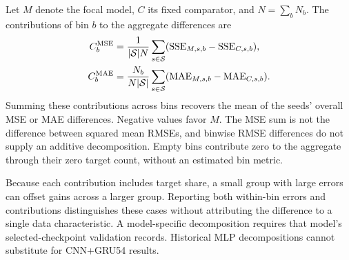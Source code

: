 \documentclass[runningheads]{llncs}
\begin{document}
Let $M$ denote the focal model, $C$ its fixed comparator, and
$N=\sum_bN_b$. The contributions of bin $b$ to the aggregate differences are
\begin{align}
 C_b^{\rm MSE}&=\frac{1}{|\mathcal S|N}\sum_{s\in\mathcal S}
  (\mathrm{SSE}_{M,s,b}-\mathrm{SSE}_{C,s,b}),
  \label{eq:strata-mse-contribution}\\
 C_b^{\rm MAE}&=\frac{N_b}{N|\mathcal S|}\sum_{s\in\mathcal S}
  (\mathrm{MAE}_{M,s,b}-\mathrm{MAE}_{C,s,b}).
  \label{eq:strata-mae-contribution}
\end{align}
Summing these contributions across bins recovers the mean of the seeds'
overall MSE or MAE differences. Negative values favor $M$. The MSE sum is
not the difference between squared mean RMSEs, and binwise RMSE differences
do not supply an additive decomposition. Empty bins contribute zero to the
aggregate through their zero target count, without an estimated bin metric.

Because each contribution includes target share, a small group with large
errors can offset gains across a larger group. Reporting both within-bin
errors and contributions distinguishes these cases without attributing the
difference to a single data characteristic. A model-specific decomposition
requires that model's selected-checkpoint validation records. Historical
MLP decompositions cannot substitute for CNN+GRU54 results.
\end{document}
